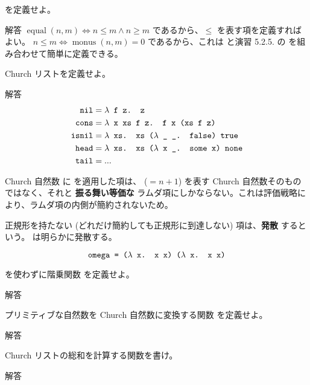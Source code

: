 \begin{jexercise*}[5.2.7]
   を定義せよ。
\end{jexercise*}
\begin{itembox}[l]{解答}
  $\operatorname{equal}(n, m) \iff n \leq m \land n \geq m$ であるから、$\leq$ を表す項を定義すればよい。
  $n \leq m \iff \operatorname{monus}(n, m) = 0$ であるから、これは  と演習 5.2.5. の  を組み合わせて簡単に定義できる。
\end{itembox}

\begin{jexercise*}[5.2.8]
  Church リストを定義せよ。
\end{jexercise*}
\begin{itembox}[l]{解答}
  \begin{align*}
    \text{\texttt{nil}}
      & = \text{\texttt{$\lambda$ f z. z}}
    \\ \text{\texttt{cons}}
      & = \text{\texttt{$\lambda$ x xs f z. f x (xs f z)}}
    \\ \text{\texttt{isnil}}
      & = \text{\texttt{$\lambda$ xs. xs ($\lambda$ \_ \_. false) true}}
    \\ \text{\texttt{head}}
      & = \text{\texttt{$\lambda$ xs. xs ($\lambda$ x \_. some x) none}}
    \\ \text{\texttt{tail}}
      & = ...
  \end{align*}
\end{itembox}

Church 自然数  に  を適用した項は、 ($= n + 1$) を表す Church 自然数そのものではなく、それと {\bf 振る舞い等価な} ラムダ項にしかならない。これは評価戦略により、ラムダ項の内側が簡約されないため。

正規形を持たない (どれだけ簡約しても正規形に到達しない) 項は、{\bf 発散} するという。 は明らかに発散する。

\[
  \text{\texttt{omega = ($\lambda$ x. x x) ($\lambda$ x. x x)}}
\]

\begin{jexercise*}[5.2.9]
   を使わずに階乗関数  を定義せよ。
\end{jexercise*}
\begin{itembox}[l]{解答}
\end{itembox}

\begin{jexercise*}[5.2.10]
  プリミティブな自然数を Church 自然数に変換する関数  を定義せよ。
\end{jexercise*}
\begin{itembox}[l]{解答}
\end{itembox}

\begin{jexercise*}[5.2.11]
  Church リストの総和を計算する関数を書け。
\end{jexercise*}
\begin{itembox}[l]{解答}
\end{itembox}
